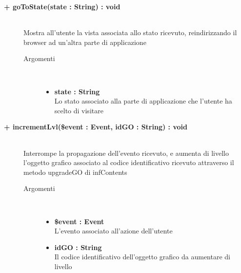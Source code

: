 \begin{description}
\begin{description}
\begin{description}
\begin{itemize}
				\end{itemize}
			
		\end{description}
	\end{description}
	
	\begin{description}
		\item[\textbf{\color{blue} + goToState(state : String) : void		}] \hfill \\
			Mostra all'utente la vista associata allo stato ricevuto, reindirizzando il browser ad un'altra parte di applicazione
			
		\begin{description}
			\item[Argomenti] \hfill \\
				\begin{itemize}
				
					\item \textbf{state : String		} \hfill \\
					Lo stato associato alla parte di applicazione che l'utente ha scelto di visitare
					
				\end{itemize}
			
		\end{description}
	\end{description}
	
	\begin{description}
		\item[\textbf{\color{blue} + incrementLvl(\$event : Event, idGO : String) : void		}] \hfill \\
			Interrompe la propagazione dell'evento ricevuto, e aumenta di livello l'oggetto grafico associato al codice identificativo ricevuto attraverso il metodo upgradeGO di infContents
			
		\begin{description}
			\item[Argomenti] \hfill \\
				\begin{itemize}
				
					\item \textbf{\$event : Event		} \hfill \\
					L'evento associato all'azione dell'utente
					\item \textbf{idGO : String		} \hfill \\
					Il codice identificativo dell'oggetto grafico da aumentare di livello
					

\end{itemize}
\end{description}
\end{description}
\end{description}
